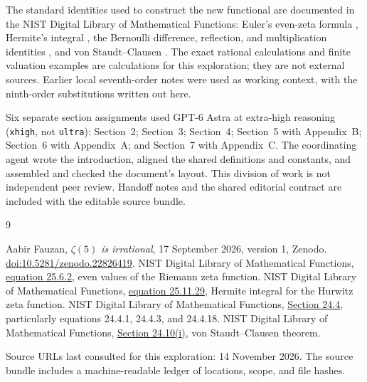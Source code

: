 The standard identities used to construct the new functional are
documented in the NIST Digital Library of Mathematical Functions:
Euler's even-zeta formula \cite{D1}, Hermite's integral \cite{D2},
the Bernoulli difference, reflection, and multiplication identities
\cite{D3}, and von Staudt--Clausen \cite{D4}.
The exact rational calculations and finite valuation examples are
calculations for this exploration; they are not external sources.
Earlier local seventh-order notes were used as working context, with
the ninth-order substitutions written out here.

Six separate section assignments used GPT-6 Astra at extra-high
reasoning (\texttt{xhigh}, not \texttt{ultra}): Section~2; Section~3;
Section~4; Section~5 with Appendix~B; Section~6 with Appendix~A; and
Section~7 with Appendix~C. The coordinating agent wrote the introduction,
aligned the shared definitions and constants, and assembled and checked
the document's layout. This division of work is not independent peer
review. Handoff notes and the shared editorial contract are included
with the editable source bundle.

\begin{thebibliography}{9}
\raggedright
{} Aabir Fauzan, \emph{$\zeta(5)$ is irrational},
17 September 2026, version 1, Zenodo.
\href{https://zenodo.org/records/22826419}{doi:10.5281/zenodo.22826419}.
 NIST Digital Library of Mathematical Functions,
\href{https://dlmf.nist.gov/25.6.E2}{equation 25.6.2},
even values of the Riemann zeta function.
 NIST Digital Library of Mathematical Functions,
\href{https://dlmf.nist.gov/25.11.E29}{equation 25.11.29},
Hermite integral for the Hurwitz zeta function.
 NIST Digital Library of Mathematical Functions,
\href{https://dlmf.nist.gov/24.4}{Section 24.4}, particularly
equations 24.4.1, 24.4.3, and 24.4.18.
 NIST Digital Library of Mathematical Functions,
\href{https://dlmf.nist.gov/24.10.i}{Section 24.10(i)},
von Staudt--Clausen theorem.
\end{thebibliography}
\noindent\small Source URLs last consulted for this exploration:
14 November 2026. The source bundle includes a machine-readable ledger
of locations, scope, and file hashes.
\endgroup
